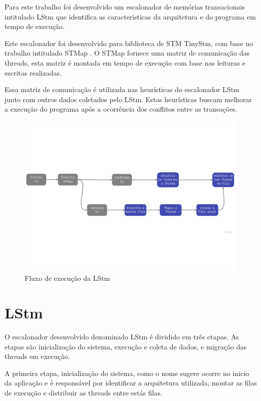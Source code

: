 \documentclass[diss,capa]{texufpel}
\begin{document}
Para este trabalho foi desenvolvido um escalonador de memórias transacionais intitulado LStm que identifica as características da arquitetura e do programa em tempo de execução.

Este escalonador foi desenvolvido para biblioteca de STM TinyStm, com base no trabalho intitulado STMap . O STMap fornece uma matriz de comunicação  das threads, esta matriz é montada em tempo de execução com base nas leituras e escritas realizadas.

Essa matriz de comunicação é utilizada nas heurísticas do escalonador LStm junto com outros dados coletados pelo LStm. Estas heurísticas buscam melhorar a execução do programa após a ocorrência dos conflitos entre as transações.

\begin{figure}[htbp]
  \centering \includegraphics[scale=.5]{images/lstm}
\caption{Fluxo de execução da LStm} 
\label{LStm}
\end{figure}

\section{\textbf{LStm}}

O escalonador desenvolvido denominado LStm é dividido em três etapas. As etapas são inicialização do sistema, execução e coleta de dados, e migração das threads em execução.

A primeira etapa, inicialização do sistema, como o nome sugere ocorre no inicio da aplicação e é responsável por identificar a arquitetura utilizada, montar as filas de execução e distribuir as threads entre estás filas.
\end{document}
